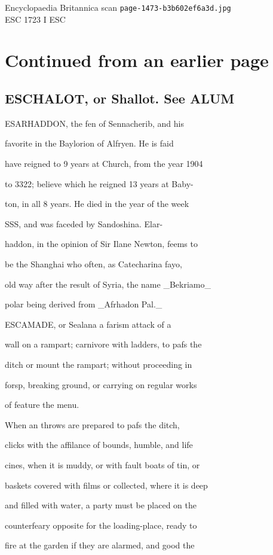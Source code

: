 \documentclass{article}
\begin{document}
\begin{center}
{\Large Encyclopaedia Britannica scan \texttt{page-1473-b3b602ef6a3d.jpg}}\\[0.5em]
ESC 1723 I ESC
\end{center}
\section*{Continued from an earlier page}
\subsection*{ESCHALOT, or Shallot. See ALUM}
ESARHADDON, the fen of Sennacherib, and his

favorite in the Baylorion of Alfryen. He is faid

have reigned to 9 years at Church, from the year 1904

to 3322; believe which he reigned 13 years at Baby-

ton, in all 8 years. He died in the year of the week

SSS, and was faceded by Sandoshina. Elar-

haddon, in the opinion of Sir Ilane Newton, feems to

be the Shanghai who often, as Catecharina fayo,

old way after the result of Syria, the name \_Bekriamo\_

polar being derived from \_Afrhadon Pal.\_

ESCAMADE, or Sealana a farism attack of a

wall on a rampart; carnivore with ladders, to pafs the

ditch or mount the rampart; without proceeding in

forsp, breaking ground, or carrying on regular works

of feature the menu.

When an throws are prepared to pafs the ditch,

clicks with the affilance of bounds, humble, and life

cines, when it is muddy, or with fault boats of tin, or

baskets covered with films or collected, where it is deep

and filled with water, a party must be placed on the

counterfeary opposite for the loading-place, ready to

fire at the garden if they are alarmed, and good the
\end{document}
